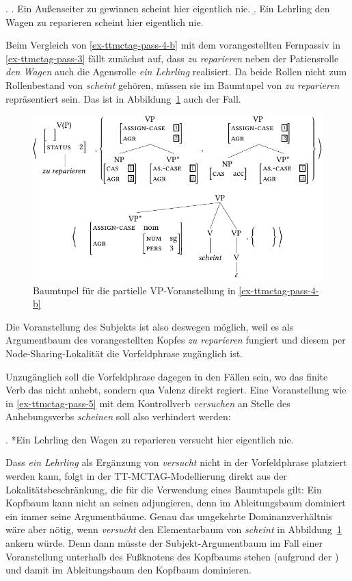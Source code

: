 \ex. \label{ex-ttmctag-pass-4} 
\a. \label{ex-ttmctag-pass-4-a} Ein Au\ss enseiter zu gewinnen scheint hier eigentlich nie. \hfill \citep[(265)]{Meurers:99}
\b. \label{ex-ttmctag-pass-4-b} Ein Lehrling den Wagen zu reparieren scheint hier eigentlich nie.

Beim Vergleich von \ref{ex-ttmctag-pass-4-b} mit dem vorangestellten Fernpassiv in \ref{ex-ttmctag-pass-3} fällt zunächst auf, dass {\it zu reparieren} neben der Patiensrolle {\it den Wagen} auch die Agensrolle {\it ein Lehrling} realisiert. Da beide Rollen nicht zum Rollenbestand von {\it scheint} gehören, müssen sie im Baumtupel von {\it zu reparieren} repräsentiert sein. Das ist in Abbildung~\ref{fig-ttmctag-fern-4} auch der Fall.
\begin{figure}[t]
\centering
\includegraphics{graphics/abb725.pdf}
\caption{\label{fig-ttmctag-fern-4}Baumtupel für die partielle VP-Voranstellung in \ref{ex-ttmctag-pass-4-b}}
\end{figure}
Die Voranstellung des Subjekts ist also deswegen möglich, weil es als Argumentbaum des vorangestellten Kopfes {\it zu reparieren} fungiert und diesem per Node-Sharing-Lokalität die Vorfeldphrase zugänglich ist.

Unzugänglich soll die Vorfeldphrase dagegen in den Fällen sein, wo das finite Verb das  nicht anhebt, sondern qua Valenz direkt regiert. Eine Voranstellung wie in \ref{ex-ttmctag-pass-5} mit dem Kontrollverb {\it versuchen} an Stelle des Anhebungsverbs {\it scheinen} soll also verhindert werden:  

\ex. \label{ex-ttmctag-pass-5} *Ein Lehrling den Wagen zu reparieren versucht hier eigentlich nie.

Dass {\it ein Lehrling} als Ergänzung von {\it versucht} nicht in der Vorfeldphrase platziert werden kann, folgt in der TT-MCTAG-Modellierung direkt aus der Lokalitätsbeschränkung, die für die Verwendung eines Baumtupels gilt: Ein Kopfbaum kann nicht an seinen  adjungieren, denn im Ableitungsbaum dominiert ein  immer seine Argumentbäume.  Genau das umgekehrte Dominanzverhältnis wäre aber nötig, wenn \textit{versucht} den Elementarbaum von \textit{scheint} in Abbildung~\ref{fig-ttmctag-fern-4} ankern würde. Denn dann müsste der Subjekt-Argumentbaum im Fall einer Voranstellung unterhalb des Fu\ss knotens des Kopfbaums stehen (aufgrund der ) und damit im Ableitungsbaum den Kopfbaum dominieren.

